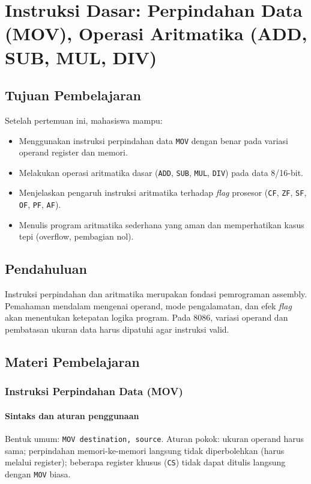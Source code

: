 \chapter{Instruksi Dasar: Perpindahan Data (MOV), Operasi Aritmatika (ADD, SUB, MUL, DIV)}

\section{Tujuan Pembelajaran}
Setelah pertemuan ini, mahasiswa mampu:
\begin{itemize}
  \item Menggunakan instruksi perpindahan data \texttt{MOV} dengan benar pada variasi operand register dan memori.
  \item Melakukan operasi aritmatika dasar (\texttt{ADD}, \texttt{SUB}, \texttt{MUL}, \texttt{DIV}) pada data 8/16-bit.
  \item Menjelaskan pengaruh instruksi aritmatika terhadap \textit{flag} prosesor (\texttt{CF}, \texttt{ZF}, \texttt{SF}, \texttt{OF}, \texttt{PF}, \texttt{AF}).
  \item Menulis program aritmatika sederhana yang aman dan memperhatikan kasus tepi (overflow, pembagian nol).
\end{itemize}

\section{Pendahuluan}
Instruksi perpindahan dan aritmatika merupakan fondasi pemrograman assembly. Pemahaman mendalam mengenai operand, mode pengalamatan, dan efek \textit{flag} akan menentukan ketepatan logika program. Pada 8086, variasi operand dan pembatasan ukuran data harus dipatuhi agar instruksi valid.

\section{Materi Pembelajaran}
\subsection{Instruksi Perpindahan Data (MOV)}
\subsubsection{Sintaks dan aturan penggunaan}
Bentuk umum: \texttt{MOV destination, source}. Aturan pokok: ukuran operand harus sama; perpindahan memori-ke-memori langsung tidak diperbolehkan (harus melalui register); beberapa register khusus (\texttt{CS}) tidak dapat ditulis langsung dengan \texttt{MOV} biasa.

